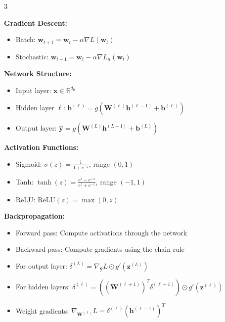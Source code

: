 \documentclass[10pt,landscape]{article}
\begin{document}
\begin{multicols}{3}
\begin{tcolorbox}[breakable, title=Classification, colback=classification, boxsep=1pt, left=1pt, right=1pt, top=1pt, bottom=1pt]
\textbf{Gradient Descent:}
\begin{itemize}[leftmargin=*,noitemsep,topsep=0pt]
    \item Batch: $\mathbf{w}_{t+1} = \mathbf{w}_t - \alpha\nabla L(\mathbf{w}_t)$ 
    \item Stochastic: $\mathbf{w}_{t+1} = \mathbf{w}_t - \alpha\nabla L_n(\mathbf{w}_t)$
\end{itemize}
\end{tcolorbox}

\begin{tcolorbox}[breakable, title=Neural Networks, colback=neural, boxsep=1pt, left=1pt, right=1pt, top=1pt, bottom=1pt]
\textbf{Network Structure:}
\begin{itemize}[leftmargin=*,noitemsep,topsep=0pt]
    \item Input layer: $\mathbf{x} \in \mathbb{R}^{d_0}$
    \item Hidden layer $\ell$: $\mathbf{h}^{(\ell)} = g(\mathbf{W}^{(\ell)}\mathbf{h}^{(\ell-1)} + \mathbf{b}^{(\ell)})$
    \item Output layer: $\hat{\mathbf{y}} = g(\mathbf{W}^{(L)}\mathbf{h}^{(L-1)} + \mathbf{b}^{(L)})$
\end{itemize}

\textbf{Activation Functions:}
\begin{itemize}[leftmargin=*,noitemsep,topsep=0pt]
    \item Sigmoid: $\sigma(z) = \frac{1}{1 + e^{-z}}$, range $(0,1)$
    \item Tanh: $\tanh(z) = \frac{e^z - e^{-z}}{e^z + e^{-z}}$, range $(-1,1)$
    \item ReLU: $\text{ReLU}(z) = \max(0, z)$
\end{itemize}

\textbf{Backpropagation:}
\begin{itemize}[leftmargin=*,noitemsep,topsep=0pt]
    \item Forward pass: Compute activations through the network
    \item Backward pass: Compute gradients using the chain rule
    \item For output layer: $\delta^{(L)} = \nabla_{\hat{\mathbf{y}}}L \odot g'(\mathbf{z}^{(L)})$
    \item For hidden layers: $\delta^{(\ell)} = ((\mathbf{W}^{(\ell+1)})^T\delta^{(\ell+1)}) \odot g'(\mathbf{z}^{(\ell)})$
    \item Weight gradients: $\nabla_{\mathbf{W}^{(\ell)}}L = \delta^{(\ell)}(\mathbf{h}^{(\ell-1)})^T$
\end{itemize}


\end{tcolorbox}
\end{multicols}
\end{document}
